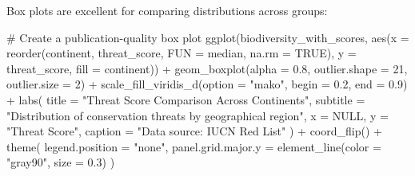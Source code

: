 \documentclass[
  letterpaper,
]{book}
\newenvironment{Shaded}{\begin{snugshade}}{\end{snugshade}}
\newcommand{\AttributeTok}[1]{\textcolor[rgb]{0.40,0.45,0.13}{#1}}
\newcommand{\CommentTok}[1]{\textcolor[rgb]{0.37,0.37,0.37}{#1}}
\newcommand{\ConstantTok}[1]{\textcolor[rgb]{0.56,0.35,0.01}{#1}}
\newcommand{\DecValTok}[1]{\textcolor[rgb]{0.68,0.00,0.00}{#1}}
\newcommand{\FloatTok}[1]{\textcolor[rgb]{0.68,0.00,0.00}{#1}}
\newcommand{\FunctionTok}[1]{\textcolor[rgb]{0.28,0.35,0.67}{#1}}
\newcommand{\NormalTok}[1]{\textcolor[rgb]{0.00,0.23,0.31}{#1}}
\newcommand{\SpecialCharTok}[1]{\textcolor[rgb]{0.37,0.37,0.37}{#1}}
\newcommand{\StringTok}[1]{\textcolor[rgb]{0.13,0.47,0.30}{#1}}
\begin{document}
Box plots are excellent for comparing distributions across groups:

\begin{Shaded}
\begin{Highlighting}[]
\CommentTok{\# Create a publication{-}quality box plot}
\FunctionTok{ggplot}\NormalTok{(biodiversity\_with\_scores, }\FunctionTok{aes}\NormalTok{(}\AttributeTok{x =} \FunctionTok{reorder}\NormalTok{(continent, threat\_score, }\AttributeTok{FUN =}\NormalTok{ median, }\AttributeTok{na.rm =} \ConstantTok{TRUE}\NormalTok{), }
                          \AttributeTok{y =}\NormalTok{ threat\_score, }
                          \AttributeTok{fill =}\NormalTok{ continent)) }\SpecialCharTok{+}
  \FunctionTok{geom\_boxplot}\NormalTok{(}\AttributeTok{alpha =} \FloatTok{0.8}\NormalTok{, }\AttributeTok{outlier.shape =} \DecValTok{21}\NormalTok{, }\AttributeTok{outlier.size =} \DecValTok{2}\NormalTok{) }\SpecialCharTok{+}
  \FunctionTok{scale\_fill\_viridis\_d}\NormalTok{(}\AttributeTok{option =} \StringTok{"mako"}\NormalTok{, }\AttributeTok{begin =} \FloatTok{0.2}\NormalTok{, }\AttributeTok{end =} \FloatTok{0.9}\NormalTok{) }\SpecialCharTok{+}
  \FunctionTok{labs}\NormalTok{(}
    \AttributeTok{title =} \StringTok{"Threat Score Comparison Across Continents"}\NormalTok{,}
    \AttributeTok{subtitle =} \StringTok{"Distribution of conservation threats by geographical region"}\NormalTok{,}
    \AttributeTok{x =} \ConstantTok{NULL}\NormalTok{,}
    \AttributeTok{y =} \StringTok{"Threat Score"}\NormalTok{,}
    \AttributeTok{caption =} \StringTok{"Data source: IUCN Red List"}
\NormalTok{  ) }\SpecialCharTok{+}
  \FunctionTok{coord\_flip}\NormalTok{() }\SpecialCharTok{+}
  \FunctionTok{theme}\NormalTok{(}
    \AttributeTok{legend.position =} \StringTok{"none"}\NormalTok{,}
    \AttributeTok{panel.grid.major.y =} \FunctionTok{element\_line}\NormalTok{(}\AttributeTok{color =} \StringTok{"gray90"}\NormalTok{, }\AttributeTok{size =} \FloatTok{0.3}\NormalTok{)}
\NormalTok{  )}
\end{Highlighting}
\end{Shaded}
\end{document}

